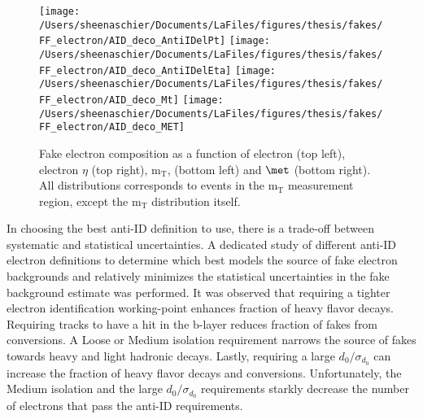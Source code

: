 \begin{figure}[htb]
        \centering
         \texttt{[image: /Users/sheenaschier/Documents/LaFiles/figures/thesis/fakes/FF\_electron/AID\_deco\_AntiIDelPt]}
        \texttt{[image: /Users/sheenaschier/Documents/LaFiles/figures/thesis/fakes/FF\_electron/AID\_deco\_AntiIDelEta]}
        \texttt{[image: /Users/sheenaschier/Documents/LaFiles/figures/thesis/fakes/FF\_electron/AID\_deco\_Mt]}
        \texttt{[image: /Users/sheenaschier/Documents/LaFiles/figures/thesis/fakes/FF\_electron/AID\_deco\_MET]}
        \caption{Fake electron composition as a function of electron \pt{} (top left), electron $\eta$ (top right), $\mathrm{m_T}$, (bottom left) and $\met$ (bottom right). All distributions corresponds to events in the $\mathrm{m_T}$ measurement region, except the $\mathrm{m_T}$ distribution itself. }
\label{fig:elDeco}
\end{figure}

In choosing the best anti-ID definition to use, there is a trade-off between systematic and statistical uncertainties.  A dedicated study of different anti-ID electron definitions to determine which best models the source of fake electron backgrounds and relatively minimizes the statistical uncertainties in the fake background estimate was performed.  It was observed that requiring a tighter electron identification working-point enhances fraction of heavy flavor decays.  Requiring tracks to have a hit in the b-layer reduces fraction of fakes from conversions.  A Loose or Medium isolation requirement narrows the source of fakes towards heavy and light hadronic decays.  Lastly, requiring a large $d_0/\sigma_{d_0}$ can increase the fraction of heavy flavor decays and conversions.  Unfortunately, the Medium isolation and the large $d_0/\sigma_{d_0}$ requirements starkly decrease the number of electrons that pass the anti-ID requirements.

